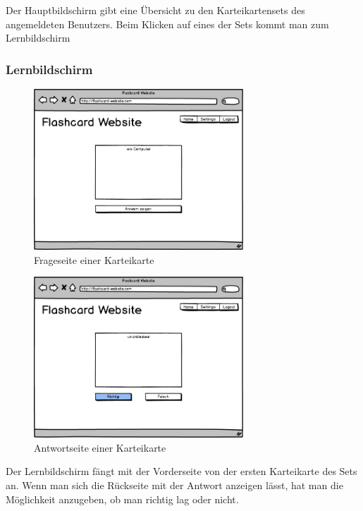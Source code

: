 Der Hauptbildschirm gibt eine Übersicht zu den Karteikartensets des angemeldeten Benutzers. Beim Klicken auf eines der Sets kommt man zum Lernbildschirm


\subsubsection{Lernbildschirm}


\begin{figure}[H]
    \centering
    \includegraphics[width=0.7\textwidth]{images/Lernscreen-Frage.png}
    \caption{Frageseite einer Karteikarte}
    \label{fig:lernscreen-frage}
\end{figure}

\begin{figure}[H]
    \centering
    \includegraphics[width=0.7\textwidth]{images/Lernscreen-Antwort.png}
    \caption{Antwortseite einer Karteikarte}
    \label{fig:lernscreen-antwort}
\end{figure}

Der Lernbildschirm fängt mit der Vorderseite von der ersten Karteikarte des Sets an. Wenn man sich die Rückseite mit der Antwort anzeigen lässt, hat man die Möglichkeit anzugeben, ob man richtig lag oder nicht.

